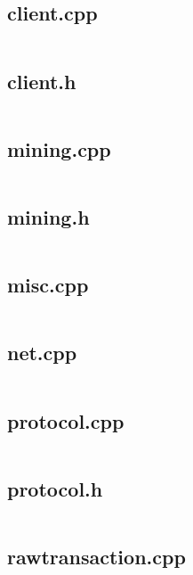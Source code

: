 \documentclass{article}
\begin{document}
\subsection{client.cpp}
\inputminted{cpp}{/home/dufferzafar/dev/@clones/bitcoin/src/rpc/client.cpp}
\newpage

\subsection{client.h}
\inputminted{cpp}{/home/dufferzafar/dev/@clones/bitcoin/src/rpc/client.h}
\newpage

\subsection{mining.cpp}
\inputminted{cpp}{/home/dufferzafar/dev/@clones/bitcoin/src/rpc/mining.cpp}
\newpage

\subsection{mining.h}
\inputminted{cpp}{/home/dufferzafar/dev/@clones/bitcoin/src/rpc/mining.h}
\newpage

\subsection{misc.cpp}
\inputminted{cpp}{/home/dufferzafar/dev/@clones/bitcoin/src/rpc/misc.cpp}
\newpage

\subsection{net.cpp}
\inputminted{cpp}{/home/dufferzafar/dev/@clones/bitcoin/src/rpc/net.cpp}
\newpage

\subsection{protocol.cpp}
\inputminted{cpp}{/home/dufferzafar/dev/@clones/bitcoin/src/rpc/protocol.cpp}
\newpage

\subsection{protocol.h}
\inputminted{cpp}{/home/dufferzafar/dev/@clones/bitcoin/src/rpc/protocol.h}
\newpage

\subsection{rawtransaction.cpp}
\inputminted{cpp}{/home/dufferzafar/dev/@clones/bitcoin/src/rpc/rawtransaction.cpp}
\newpage
\end{document}
